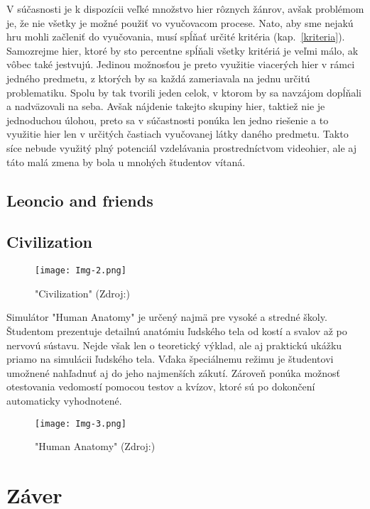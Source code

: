 \documentclass[10pt,twoside,slovak,a4paper]{article}
\begin{document}
V súčasnosti je k dispozícii veľké množstvo hier rôznych žánrov, avšak problémom je, že nie všetky je možné použiť vo vyučovacom procese. Nato, aby sme nejakú hru mohli začleniť do vyučovania, musí spĺňať určité kritéria (kap.~\ref{kriteria}). Samozrejme hier, ktoré by sto percentne spĺňali všetky kritériá je veľmi málo, ak vôbec také jestvujú. Jedinou možnosťou je preto využitie viacerých hier v rámci jedného predmetu, z ktorých by sa každá zameriavala na jednu určitú problematiku. Spolu by tak tvorili jeden celok, v ktorom by sa navzájom dopĺňali a nadväzovali na seba. Avšak nájdenie takejto skupiny hier, taktiež nie je jednoduchou úlohou, preto sa v súčastnosti ponúka len jedno riešenie a to využitie hier len v určitých častiach vyučovanej látky daného predmetu. Takto síce nebude využitý plný potenciál vzdelávania prostredníctvom videohier, ale aj táto malá zmena by bola u mnohých študentov vítaná. 

\subsection{Leoncio and friends} \label{hra-1}


\subsection{Civilization} \label{hra-2}

\begin{figure}[tbh]
	\centering
	\texttt{[image: Img-2.png]}
	\caption{"Civilization" (Zdroj:\cite{Img-Civil})}
	\label{obr-2}
\end{figure}

Simulátor "Human Anatomy"\cite{Antom} je určený najmä pre vysoké a stredné školy. Študentom prezentuje detailnú anatómiu ľudského tela od kostí a svalov až po nervovú sústavu. Nejde však len o teoretický výklad, ale aj praktickú ukážku priamo na simulácii ľudského tela. Vďaka špeciálnemu režimu je študentovi umožnené nahľadnuť aj do jeho najmenších zákutí. Zároveň ponúka možnosť otestovania vedomostí pomocou testov a kvízov, ktoré sú po dokončení automaticky vyhodnotené.

\begin{figure}[tbh]
	\centering
	\texttt{[image: Img-3.png]}
	\caption{"Human Anatomy" (Zdroj:\cite{Img-Antom})}
	\label{obr-3}
\end{figure}

\section{Záver}



\end{document}
